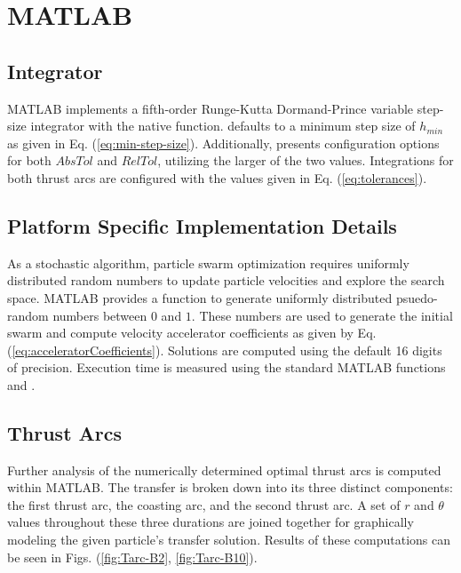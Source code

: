 \section{MATLAB}

\subsection{Integrator}

\noindent MATLAB implements a fifth-order Runge-Kutta Dormand-Prince variable step-size integrator with the native  function. 
defaults to a minimum step size of $h_{min}$ as given in Eq. (\ref{eq:min-step-size}). Additionally, 
presents configuration options for both $AbsTol$ and $RelTol$, utilizing the larger of the two values.
Integrations for both thrust arcs are configured with the values given in Eq. (\ref{eq:tolerances}).

\subsection{Platform Specific Implementation Details}

\noindent As a stochastic algorithm, particle swarm optimization requires uniformly distributed random numbers to update particle velocities 
and explore the search space. MATLAB provides a  function to generate uniformly distributed
psuedo-random numbers between $0$ and $1$. These numbers are used to generate the initial swarm and compute velocity accelerator coefficients as given by Eq. (\ref{eq:acceleratorCoefficients}).
Solutions are computed using the default 16 digits of precision. Execution time is measured using the standard MATLAB
functions  and .


\subsection{Thrust Arcs}

\noindent Further analysis of the numerically determined optimal thrust arcs is computed within MATLAB.
The transfer is broken down into its three distinct components: the first thrust arc, the coasting arc, and the second thrust arc. 
A set of $r$ and $\theta$ values throughout these three durations are joined together for graphically modeling the given particle's transfer
solution. Results of these computations can be seen in Figs. (\ref{fig:Tarc-B2}, \ref{fig:Tarc-B10}). \newline

